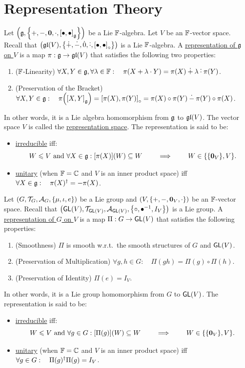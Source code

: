 \documentclass[11pt,reqno]{amsart}
\newcommand{\pwplus}{\mathbin{\dot{+}}}
\newcommand{\pwminus}{\mathbin{\dot{-}}}
\newcommand{\pwcdot}{\mathbin{\dot{\cdot}}}
\newcommand{\pwzero}{\mathbin{\dot{0}}}
\begin{document}
\section{Representation Theory}
\begin{Def}
Let $\Br{\g,\set{+,-,\bm0,\cdot,\SqBr{\bullet,\bullet}_\g}}$ be a Lie $\mathbb{F}$-algebra.
Let $V$ be an $\mathbb{F}$-vector space.
Recall that $\Br{\gl(V),\set{\pwplus,\pwminus,\pwzero,\pwcdot,\SqBr{\bullet,\bullet}_\circ}}$
is a Lie $\mathbb{F}$-algebra.
A \ul{representation of $\mathfrak{g}$ on $V$} is a map $\pi:\mathfrak{g}\to\mathfrak{gl}(V)$
that satisfies the following two properties:
\begin{enumerate}
\item($\mathbb{F}$-Linearity)
$\forall X,Y\in\g,\forall\lambda\in\F:\quad
\pi(X+\lambda\cdot Y)=\pi(X)\pwplus\lambda\pwcdot\pi(Y)$.
\item(Preservation of the Bracket)
$\forall X,Y\in\g:\quad
\pi\Br{\SqBr{X,Y}_\g}=\SqBr{\pi(X),\pi(Y)}_\circ
=\pi(X)\circ\pi(Y)\pwminus\pi(Y)\circ\pi(X)$.
\end{enumerate}
In other words, it is a Lie algebra homomorphism from $\mathfrak{g}$ to $\mathfrak{gl}(V)$.
The vector space $V$ is called the \ul{representation space}.
The representation is said to be:
\begin{itemize}
\item \ul{irreducible} iff:
\[
W\le V\tand\forall X\in\g:\FUNC{\pi(X)}{W}\subseteq W
\qquad\implies\qquad W\in\set{\set{\bm0_{V}},V}.
\]
\item \ul{unitary} (when $\mathbb{F}=\mathbb{C}$ and $V$ is an inner product space) iff
$\forall X\in\mathfrak{g}:\quad\pi(X)^{\dagger}=-\pi(X)$.
\end{itemize}
\end{Def}


\begin{Def}
Let $\Br{G,\T_G,\A_G,\set{\mu,\iota,e}}$ be a Lie group and
$\Br{V,\set{+,-,\bm0_V,\cdot}}$ be an $\mathbb{F}$-vector space.
Recall that $\Br{\GL(V),\T_{\GL(V)},\A_{\GL(V)},\set{\circ,\bullet\inv,I_V}}$ is a Lie group.
A \ul{representation of $G$ on $V$} is a map
$\Pi:G\to\operatorname{\mathsf{GL}}(V)$ that satisfies the following properties:
\begin{enumerate}
\item (Smoothness)
$\Pi$ is smooth w.r.t.\ the smooth structures of $G$ and $\operatorname{\mathsf{GL}}(V)$.
\item (Preservation of Multiplication)
$\forall g,h\in G:\quad\Pi(gh)=\Pi(g)\circ\Pi(h)$.
\item (Preservation of Identity)
$\Pi(e)=I_V$.
\end{enumerate}
In other words, it is a Lie group homomorphism from $G$ to $\operatorname{\mathsf{GL}}(V)$.
The representation is said to be:
\begin{itemize}
\item \ul{irreducible} iff:
\[
W\le V\tand\forall g\in G:\FUNC{\Pi(g)}{W}\subseteq W
\qquad\implies\qquad W\in\set{\set{\bm0_{V}},V}.
\]
\item \ul{unitary} (when $\mathbb{F}=\mathbb{C}$ and $V$ is an inner product space) iff
$\forall g\in G:\quad\Pi(g)^{\dagger}\Pi(g)=I_V$.
\end{itemize}
\end{Def}
\end{document}
